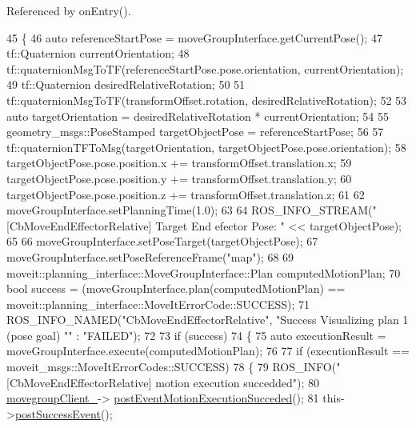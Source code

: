 Referenced by on\+Entry().


\begin{DoxyCode}
45     \{
46         \textcolor{keyword}{auto} referenceStartPose = moveGroupInterface.getCurrentPose();
47         tf::Quaternion currentOrientation;
48         tf::quaternionMsgToTF(referenceStartPose.pose.orientation, currentOrientation);
49         tf::Quaternion desiredRelativeRotation;
50 
51         tf::quaternionMsgToTF(transformOffset.rotation, desiredRelativeRotation);
52 
53         \textcolor{keyword}{auto} targetOrientation = desiredRelativeRotation * currentOrientation;
54 
55         geometry\_msgs::PoseStamped targetObjectPose = referenceStartPose;
56 
57         tf::quaternionTFToMsg(targetOrientation, targetObjectPose.pose.orientation);
58         targetObjectPose.pose.position.x += transformOffset.translation.x;
59         targetObjectPose.pose.position.y += transformOffset.translation.y;
60         targetObjectPose.pose.position.z += transformOffset.translation.z;
61 
62         moveGroupInterface.setPlanningTime(1.0);
63 
64         ROS\_INFO\_STREAM(\textcolor{stringliteral}{"[CbMoveEndEffectorRelative] Target End efector Pose: "} << targetObjectPose);
65 
66         moveGroupInterface.setPoseTarget(targetObjectPose);
67         moveGroupInterface.setPoseReferenceFrame(\textcolor{stringliteral}{"map"});
68 
69         moveit::planning\_interface::MoveGroupInterface::Plan computedMotionPlan;
70         \textcolor{keywordtype}{bool} success = (moveGroupInterface.plan(computedMotionPlan) == 
      moveit::planning\_interface::MoveItErrorCode::SUCCESS);
71         ROS\_INFO\_NAMED(\textcolor{stringliteral}{"CbMoveEndEffectorRelative"}, \textcolor{stringliteral}{"Success Visualizing plan 1 (pose goal) %
      ""} : \textcolor{stringliteral}{"FAILED"});
72 
73         \textcolor{keywordflow}{if} (success)
74         \{
75             \textcolor{keyword}{auto} executionResult = moveGroupInterface.execute(computedMotionPlan);
76 
77             \textcolor{keywordflow}{if} (executionResult == moveit\_msgs::MoveItErrorCodes::SUCCESS)
78             \{
79                 ROS\_INFO(\textcolor{stringliteral}{"[CbMoveEndEffectorRelative] motion execution succedded"});
80                 \hyperlink{classmove__group__interface__client_1_1CbMoveEndEffectorRelative_a979ec9c309b1b52a0d0e254b49865fdc}{movegroupClient\_}->
      \hyperlink{classmove__group__interface__client_1_1ClMoveGroup_a1b617e0018790b8ebf23aea75eb7acba}{postEventMotionExecutionSucceded}();
81                 this->\hyperlink{classsmacc_1_1SmaccAsyncClientBehavior_adf18efe1f0e4eacc1277b8865a8a94b1}{postSuccessEvent}();

\end{DoxyCode}
